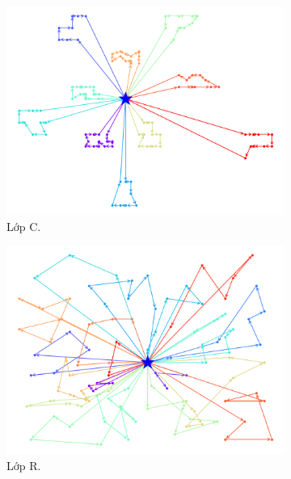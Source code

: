 \begin{figure}[H] %
	\label{fig:perf_ct_c2}
	\begin{subfigure}{.3\textwidth}
		\centering
		\includegraphics[width=1\linewidth]{figures/routes_c101.png}
		\caption{Lớp C.}
		\label{fig:route_c}
	\end{subfigure}%
	\begin{subfigure}{.3\textwidth}
		\centering
		\includegraphics[width=1\linewidth]{figures/routes_r101.png}
		\caption{Lớp R.}
		\label{fig:route_r}
	\end{subfigure}
	\begin{subfigure}{.3\textwidth}
		\centering

\end{subfigure}
\end{figure}

